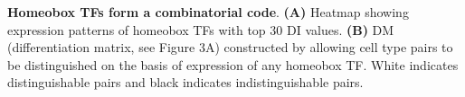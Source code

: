 \textbf{Homeobox TFs form a combinatorial code}.  
\textbf{(A)} Heatmap showing expression patterns of homeobox TFs with top 30 DI values. \textbf{(B)} DM (differentiation matrix, see Figure 3A) constructed by allowing cell type pairs to be distinguished on the basis of expression of any homeobox TF. White indicates distinguishable pairs and black indicates indistinguishable pairs. 